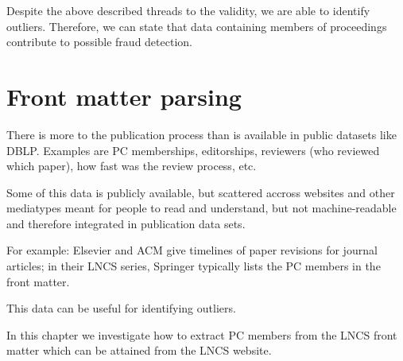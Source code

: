 \documentclass{ou-report}
\begin{document}
Despite the above described threads to the validity, we are able to identify 
outliers. Therefore, we can state that data containing members of proceedings 
contribute to possible fraud detection.

\chapter{Front matter parsing}
\label{chp:front_matter_parsing}
There is more to the publication process than is available in public
datasets like DBLP. Examples are PC memberships, editorships, reviewers (who
reviewed which paper), how fast was the review process, etc.

Some of this data is publicly available, but scattered accross websites and 
other mediatypes meant for people to read and understand, but not
machine-readable and therefore integrated in publication data sets.

For example: Elsevier and ACM give timelines of paper revisions for journal
articles; in their LNCS series, Springer typically lists the PC members in the 
front matter.

This data can be useful for identifying outliers.

In this chapter we investigate how to extract PC members from the LNCS front
matter which can be attained from the LNCS website.

        
\end{document}
